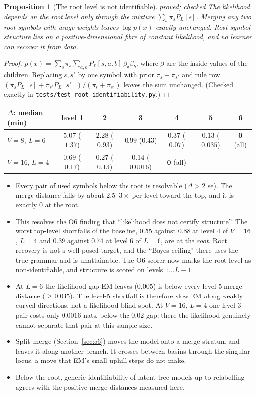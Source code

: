 \documentclass[11pt]{article}
\newtheorem{proposition}[theorem]{Proposition}
\theoremstyle{definition}
\theoremstyle{remark}
\newcommand{\st}[1]{\textsf{\small\color{gray}#1}}
\begin{document}
\begin{proposition}[The root level is not identifiable]\label{prop:root}\st{proved; checked}
The likelihood depends on the root level only through the mixture $\sum_s\pi_sP_L[s]$. Merging any two root symbols with usage weights leaves $\log p(x)$ exactly unchanged. Root-symbol structure lies on a positive-dimensional fibre of constant likelihood, and no learner can recover it from data.
\end{proposition}
\begin{proof}
$p(x)=\sum_s\pi_s\sum_{a,b}P_L[s,a,b]\,\beta_a\beta_b$, where $\beta$ are the inside values of the children. Replacing $s,s'$ by one symbol with prior $\pi_s+\pi_{s'}$ and rule row $(\pi_sP_L[s]+\pi_{s'}P_L[s'])/(\pi_s+\pi_{s'})$ leaves the sum unchanged. (Checked exactly in \texttt{tests/test\_root\_identifiability.py}.)
\end{proof}
\begin{center}\small
\begin{tabular}{lcccccc}
\toprule
$\Delta$: median (min) & level 1 & 2 & 3 & 4 & 5 & 6\\
\midrule
$V=8$, $L=6$ & $5.07$ ($1.37$) & $2.28$ ($0.93$) & $0.99$ ($0.43$) & $0.37$ ($0.07$) & $0.13$ ($0.035$) & $\mathbf 0$ (all)\\
$V=16$, $L=4$ & $0.69$ ($0.17$) & $0.27$ ($0.13$) & $0.14$ ($0.0016$) & $\mathbf 0$ (all) & & \\
\bottomrule
\end{tabular}
\end{center}
\begin{itemize}
  \item Every pair of used symbols below the root is resolvable ($\Delta>2$ se). The merge distance falls by about $2.5$--$3\times$ per level toward the top, and it is exactly $0$ at the root.
  \item This resolves the O6 finding that ``likelihood does not certify structure''. The worst top-level shortfalls of the baseline, $0.55$ against $0.88$ at level 4 of $V=16$, $L=4$ and $0.39$ against $0.74$ at level 6 of $L=6$, are at the \emph{root}. Root recovery is not a well-posed target, and the ``Bayes ceiling'' there uses the true grammar and is unattainable. The O6 scorer now marks the root level as non-identifiable, and structure is scored on levels $1\dots L-1$.
  \item At $L=6$ the likelihood gap EM leaves ($0.005$) is below every level-5 merge distance ($\ge0.035$). The level-5 shortfall is therefore slow EM along weakly curved directions, not a likelihood blind spot. At $V=16$, $L=4$ one level-3 pair costs only $0.0016$ nats, below the $0.02$ gap: there the likelihood genuinely cannot separate that pair at this sample size.
  \item Split--merge (Section~\ref{sec:o6}) moves the model onto a merge stratum and leaves it along another branch. It crosses between basins through the singular locus, a move that EM's small uphill steps do not make.
  \item Below the root, generic identifiability of latent tree models up to relabelling \cite{amr09} agrees with the positive merge distances measured here.
\end{itemize}
\end{document}
